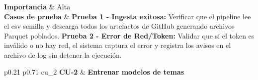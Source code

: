 {	\textbf{Importancia}          & Alta                                                                                                                 \\
	\textbf{Casos de prueba}      & \textbf{Prueba 1 - Ingesta exitosa:} Verificar que el pipeline lee el \acrshort{csv} semilla y descarga todos los artefactos de GitHub generando archivos Parquet poblados. \newline \textbf{Prueba 2 - Error de Red/Token:} Validar que si el token es inválido o no hay red, el sistema captura el error y registra los avisos en el archivo de log sin detener la ejecución. \\
}

{p{0.21\textwidth} p{0.71\textwidth}}
{cu_2}
{
	\textbf{CU-2}                 & \textbf{Entrenar modelos de temas}                                                                            \\
}
